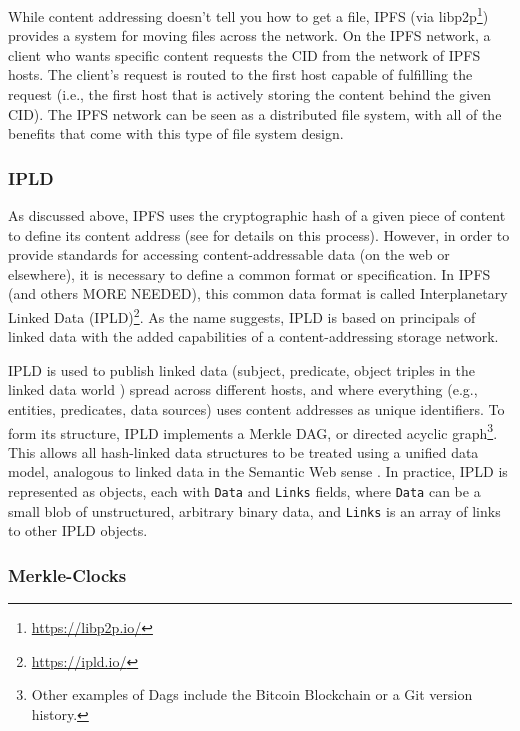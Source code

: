 \documentclass{textile}
\begin{document}
While content addressing doesn't tell you how to get a file, IPFS (via libp2p\footnote{\url{https://libp2p.io/}}) provides a system for moving files across the network.  On the IPFS network, a client who wants specific content requests the CID from the network of IPFS hosts. The client's request is routed to the first host capable of fulfilling the request (i.e., the first host that is actively storing the content behind the given CID). The IPFS network can be seen as a distributed file system, with all of the benefits that come with this type of file system design.

\subsubsection{IPLD}

As discussed above, IPFS uses the cryptographic hash of a given piece of content to define its content address (see \cite{benetIPFSContentAddressed2014} for details on this process). However, in order to provide standards for accessing content-addressable data (on the web or elsewhere), it is necessary to define a common format or specification. In IPFS (and others \cite[e.g.,]{protocollabsFilecoinDecentralizedStorage2017} MORE NEEDED), this common data format is called Interplanetary Linked Data (IPLD)\footnote{\url{https://ipld.io/}}. As the name suggests, IPLD is based on principals of linked data \cite{berners-leeLinkedData2009,bizerLinkedDataStory2011} with the added capabilities of a content-addressing storage network. 

IPLD is used to publish linked data (subject, predicate, object triples in the linked data world \cite{heathLinkedDataEvolving2011}) spread across different hosts, and where everything (e.g., entities, predicates, data sources) uses content addresses as unique identifiers. To form its structure, IPLD implements a Merkle DAG, or directed acyclic graph\footnote{Other examples of Dags include the Bitcoin Blockchain or a Git version history.}. This allows all hash-linked data structures to be treated using a unified data model, analogous to linked data in the Semantic Web sense \cite{brendanobrienDeterministicQueryingDistributed2017}. In practice, IPLD is represented as objects, each with \texttt{Data} and \texttt{Links} fields, where \texttt{Data} can be a small blob of unstructured, arbitrary binary data, and \texttt{Links} is an array of links to other IPLD objects. 

\subsubsection{Merkle-Clocks} \label{sec:merkleclocks}
\end{document}
